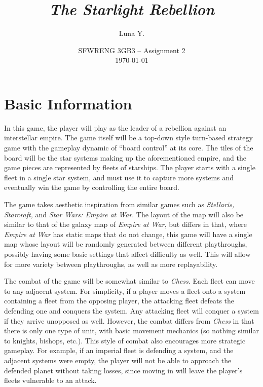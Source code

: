\documentclass[10pt]{article}
\begin{document}
\title{\textit{The Starlight Rebellion}}
\author{Luna Y.}
\date{
    SFWRENG 3GB3 -- Assignment 2\\[0.25cm]
    \today
}
\maketitle

\tableofcontents

\section{Basic Information}

In this game, the player will play as the leader of a rebellion against an interstellar empire. The game itself will be a top-down style
turn-based strategy game with the gameplay dynamic of ``board control'' at its core. The tiles of the board will be the star systems
making up the aforementioned empire, and the game pieces are represented by fleets of starships. The player starts with a single fleet
in a single star system, and must use it to capture more systems and eventually win the game by controlling the entire board.

The game takes aesthetic inspiration from similar games such as \textit{Stellaris, Starcraft,} and \textit{Star Wars: Empire at War}.
The layout of the map will also be similar to that of the galaxy map of \textit{Empire at War}, but differs in that, where \textit{Empire at War}
has static maps that do not change, this game will have a single map whose layout will be randomly generated between different playthroughs,
possibly having some basic settings that affect difficulty as well. This will allow for more variety between playthroughs, as well as more replayability.

The combat of the game will be somewhat similar to \textit{Chess}. Each fleet can move to any adjacent system.
For simplicity, if a player moves a fleet onto a system containing a fleet from the opposing player, the attacking
fleet defeats the defending one and conquers the system. Any attacking fleet will conquer a system if they arrive unopposed as well.
However, the combat differs from \textit{Chess} in that there is only one type of unit, with basic movement mechanics (so nothing
similar to knights, bishops, etc.). This style of combat also encourages more strategic gameplay. For example, if an imperial fleet
is defending a system, and the adjacent systems were empty, the player will not be able to approach the defended planet without taking losses,
since moving in will leave the player's fleets vulnerable to an attack.
\end{document}
